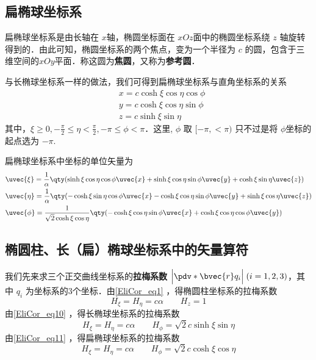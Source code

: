 \subsection{扁椭球坐标系}
扁椭球坐标系是由长轴在 $x$轴，椭圆坐标面在 $xOz$面中的椭圆坐标系绕 $z$ 轴旋转得到的．由此可知，椭圆坐标系的两个焦点，变为一个半径为 $c$ 的圆，包含于三维空间的$xOy$平面．称这圆为\textbf{焦圆}，又称为\textbf{参考圆}．

与长椭球坐标系一样的做法，我们可得到扁椭球坐标系与直角坐标系的关系
\begin{equation}\label{EliCor_eq11}
\begin{aligned}
&x=c\cosh\xi\cos\eta\cos\phi\\
&y=c\cosh\xi\cos\eta\sin\phi\\
&z=c\sinh\xi\sin\eta
\end{aligned}
\end{equation}
其中，$\xi\geq 0,-\frac{\pi}{2}\leq\eta<\frac{\pi}{2},-\pi\leq\phi<\pi$．这里, $\phi$ 取 $[-\pi,<\pi)$ 只不过是将 $\phi$坐标的起点选为 $-\pi$.

扁椭球坐标系中坐标的单位矢量为
\begin{equation}
\begin{aligned}
&\uvec{\xi}=\frac{1}{\alpha}\qty(\sinh\xi\cos\eta\cos\phi\uvec{x}+\sinh\xi\cos\eta\sin\phi\uvec{y}+\cosh\xi\sin\eta\uvec{z})\\
&\uvec{\eta}=\frac{1}{\alpha}\qty(-\cosh\xi\sin\eta\cos\phi\uvec{x}-\cosh\xi\cos\eta\sin\phi\uvec{y}+\sinh\xi\cos\eta\uvec{z})\\
&\uvec{\phi}=\frac{1}{\sqrt{2}\cosh\xi\cos\eta}\qty(-\cosh\xi\cos\eta\sin\phi\uvec{x}+\cosh\xi\cos\eta\cos\phi\uvec{y})
\end{aligned}
\end{equation}

\subsection{椭圆柱、长（扁）椭球坐标系中的矢量算符}
我们先来求三个正交曲线坐标系的\textbf{拉梅系数} $\Big|\pdv*{\bvec{r}}{q_i}\Big|\;(i=1,2,3)$，其中 $q_i$ 为坐标系的3个坐标．由\autoref{EliCor_eq1} ，得椭圆柱坐标系的拉梅系数
\begin{equation}
H_\xi=H_\eta=c\alpha \quad \quad H_z=1
\end{equation}
由\autoref{EliCor_eq10} ，得长椭球坐标系的拉梅系数
\begin{equation}
H_\xi=H_\eta=c\alpha \quad \quad H_\phi=\sqrt{2}c\sinh\xi\sin\eta
\end{equation}
由\autoref{EliCor_eq11} ，得扁椭球坐标系的拉梅系数
\begin{equation}
H_\xi=H_\eta=c\alpha \quad \quad H_\phi=\sqrt{2}c\cosh\xi\cos\eta
\end{equation}
